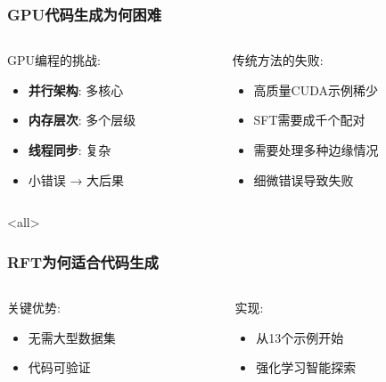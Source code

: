 \documentclass[aspectratio=169]{beamer}
\begin{document}
\begin{frame}[shrink=10]
	\frametitle{GPU代码生成为何困难}
	\begin{columns}[T]
		\begin{column}{0.48\textwidth}
			\begin{block}{GPU编程的挑战:}
				\begin{itemize}\setlength{\itemsep}{0em}
					\item \textbf{并行架构}: 多核心
					\item \textbf{内存层次}: 多个层级
					\item \textbf{线程同步}: 复杂
					\item 小错误 → 大后果
				\end{itemize}
			\end{block}
		\end{column}
		\begin{column}{0.48\textwidth}
			\begin{block}{传统方法的失败:}
				\begin{itemize}\setlength{\itemsep}{0em}
					\item 高质量CUDA示例稀少
					\item SFT需要成千个配对
					\item 需要处理多种边缘情况
					\item 细微错误导致失败
				\end{itemize}
			\end{block}
		\end{column}
	\end{columns}
\end{frame}

\mode<all>{\vspace{-0.5cm}}

\begin{frame}[t]
	\frametitle{RFT为何适合代码生成}
	\begin{columns}[T]
		\begin{column}{0.48\textwidth}
			\begin{block}{关键优势:}
				\begin{itemize}
					\item 无需大型数据集
					\item 代码可验证
				\end{itemize}
			\end{block}
		\end{column}
		\begin{column}{0.48\textwidth}
			\begin{block}{实现:}
				\begin{itemize}
					\item 从13个示例开始
					\item 强化学习智能探索
				\end{itemize}
			\end{block}
		\end{column}
	\end{columns}
\end{frame}
\end{document}
